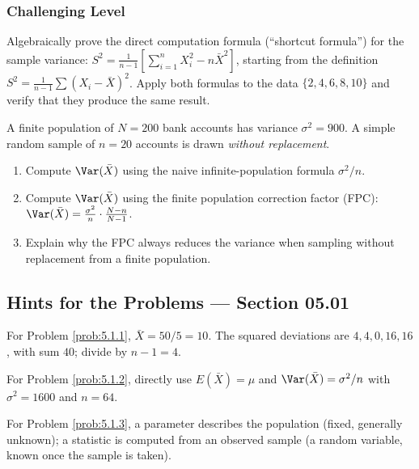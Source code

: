 \subsubsection*{Challenging Level}

\begin{problema}
	\label{prob:5.1.9}
	Algebraically prove the direct computation formula (``shortcut formula'') for the sample variance: $S^{2} = \frac{1}{n-1}\left[\sum_{i=1}^n X_i^{2} - n\bar{X}^{2}\right]$, starting from the definition $S^{2} = \frac{1}{n-1}\sum(X_i-\bar{X})^{2}$. Apply both formulas to the data $\{2, 4, 6, 8, 10\}$ and verify that they produce the same result.
\end{problema}

\begin{problema}
	\label{prob:5.1.10}
	A finite population of $N = 200$ bank accounts has variance $\sigma^{2} = 900$. A simple random sample of $n = 20$ accounts is drawn \emph{without replacement}.
	\begin{enumerate}
		\item Compute $\Var(\bar{X})$ using the naive infinite-population formula $\sigma^{2}/n$.
		\item Compute $\Var(\bar{X})$ using the finite population correction factor (FPC): $\Var(\bar{X}) = \frac{\sigma^{2}}{n}\cdot\frac{N-n}{N-1}$.
		\item Explain why the FPC always reduces the variance when sampling without replacement from a finite population.
	\end{enumerate}
\end{problema}

\subsection*{Hints for the Problems --- Section 05.01}

\begin{sugerencia}
	\label{sug:5.1.1}
	For Problem \ref{prob:5.1.1}, $\bar{X} = 50/5 = 10$. The squared deviations are $4, 4, 0, 16, 16$, with sum $40$; divide by $n-1=4$.
\end{sugerencia}

\begin{sugerencia}
	\label{sug:5.1.2}
	For Problem \ref{prob:5.1.2}, directly use $E(\bar{X})=\mu$ and $\Var(\bar{X})=\sigma^{2}/n$ with $\sigma^{2}=1600$ and $n=64$.
\end{sugerencia}

\begin{sugerencia}
	\label{sug:5.1.3}
	For Problem \ref{prob:5.1.3}, a parameter describes the population (fixed, generally unknown); a statistic is computed from an observed sample (a random variable, known once the sample is taken).
\end{sugerencia}


